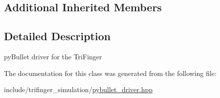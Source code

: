 \subsection*{Additional Inherited Members}


\subsection{Detailed Description}
py\+Bullet driver for the Tri\+Finger 

The documentation for this class was generated from the following file\+:\begin{DoxyCompactItemize}
\item 
include/trifinger\+\_\+simulation/\hyperlink{pybullet__driver_8hpp}{pybullet\+\_\+driver.\+hpp}\end{DoxyCompactItemize}
